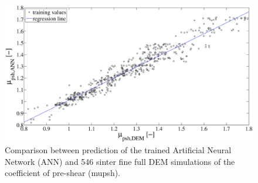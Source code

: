 \begin{figure}[!h] 
\centering 
\includegraphics[width=.80\columnwidth]{images/022regression.eps}
\caption[Comparison between prediction of the trained ANN and full DEM
simulation]{Comparison between prediction of the trained Artificial Neural
Network (\acs{ANN}) and 546 sinter fine full DEM simulations of the coefficient
of pre-shear (\acs{mupsh}).}
\label{fig:022regression} 
\end{figure}